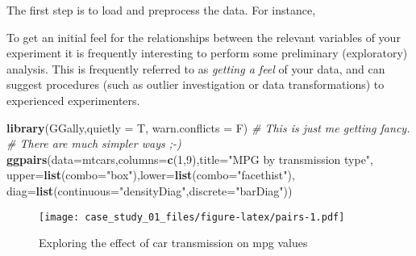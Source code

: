 \documentclass[
]{article}
\newenvironment{Shaded}{\begin{snugshade}}{\end{snugshade}}
\newcommand{\AttributeTok}[1]{\textcolor[rgb]{0.13,0.29,0.53}{#1}}
\newcommand{\CommentTok}[1]{\textcolor[rgb]{0.56,0.35,0.01}{\textit{#1}}}
\newcommand{\ControlFlowTok}[1]{\textcolor[rgb]{0.13,0.29,0.53}{\textbf{#1}}}
\newcommand{\DecValTok}[1]{\textcolor[rgb]{0.00,0.00,0.81}{#1}}
\newcommand{\FunctionTok}[1]{\textcolor[rgb]{0.13,0.29,0.53}{\textbf{#1}}}
\newcommand{\NormalTok}[1]{#1}
\newcommand{\OtherTok}[1]{\textcolor[rgb]{0.56,0.35,0.01}{#1}}
\newcommand{\SpecialCharTok}[1]{\textcolor[rgb]{0.81,0.36,0.00}{\textbf{#1}}}
\newcommand{\StringTok}[1]{\textcolor[rgb]{0.31,0.60,0.02}{#1}}
\begin{document}
The first step is to load and preprocess the data. For instance,

\begin{Shaded}
\end{Shaded}

To get an initial feel for the relationships between the relevant
variables of your experiment it is frequently interesting to perform
some preliminary (exploratory) analysis. This is frequently referred to
as \emph{getting a feel} of your data, and can suggest procedures (such
as outlier investigation or data transformations) to experienced
experimenters.

\begin{Shaded}
\begin{Highlighting}[]
\FunctionTok{library}\NormalTok{(GGally,}\AttributeTok{quietly =}\NormalTok{ T, }\AttributeTok{warn.conflicts =}\NormalTok{ F) }\CommentTok{\# This is just me getting fancy.}
                                                \CommentTok{\# There are much simpler ways ;{-})}
\FunctionTok{ggpairs}\NormalTok{(}\AttributeTok{data=}\NormalTok{mtcars,}\AttributeTok{columns=}\FunctionTok{c}\NormalTok{(}\DecValTok{1}\NormalTok{,}\DecValTok{9}\NormalTok{),}\AttributeTok{title=}\StringTok{"MPG by transmission type"}\NormalTok{,}
        \AttributeTok{upper=}\FunctionTok{list}\NormalTok{(}\AttributeTok{combo=}\StringTok{"box"}\NormalTok{),}\AttributeTok{lower=}\FunctionTok{list}\NormalTok{(}\AttributeTok{combo=}\StringTok{"facethist"}\NormalTok{),}
        \AttributeTok{diag=}\FunctionTok{list}\NormalTok{(}\AttributeTok{continuous=}\StringTok{"densityDiag"}\NormalTok{,}\AttributeTok{discrete=}\StringTok{"barDiag"}\NormalTok{))}
\end{Highlighting}
\end{Shaded}

\begin{figure}
\centering
\texttt{[image: case\_study\_01\_files/figure-latex/pairs-1.pdf]}
\caption{Exploring the effect of car transmission on mpg values}
\end{figure}
\end{document}
